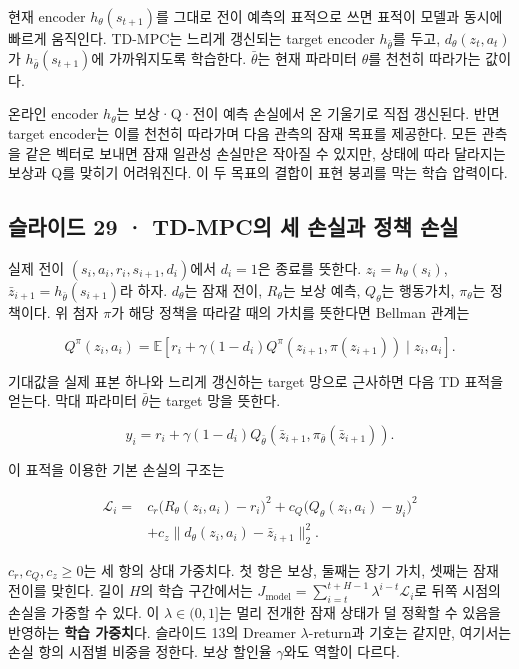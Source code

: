\documentclass[11pt,a4paper]{article}
\begin{document}
현재 encoder $h_\theta(s_{t+1})$를 그대로 전이 예측의 표적으로 쓰면 표적이 모델과 동시에 빠르게 움직인다. TD-MPC는 느리게 갱신되는 target encoder $h_{\bar\theta}$를 두고, $d_\theta(z_t,a_t)$가 $h_{\bar\theta}(s_{t+1})$에 가까워지도록 학습한다. $\bar\theta$는 현재 파라미터 $\theta$를 천천히 따라가는 값이다.\par

온라인 encoder $h_\theta$는 보상·Q·전이 예측 손실에서 온 기울기로 직접 갱신된다. 반면 target encoder는 이를 천천히 따라가며 다음 관측의 잠재 목표를 제공한다. 모든 관측을 같은 벡터로 보내면 잠재 일관성 손실만은 작아질 수 있지만, 상태에 따라 달라지는 보상과 Q를 맞히기 어려워진다. 이 두 목표의 결합이 표현 붕괴를 막는 학습 압력이다.\par

\subsection{슬라이드 29 · TD-MPC의 세 손실과 정책 손실}

실제 전이 $(s_i,a_i,r_i,s_{i+1},d_i)$에서 $d_i=1$은 종료를 뜻한다. $z_i=h_\theta(s_i)$, $\bar z_{i+1}=h_{\bar\theta}(s_{i+1})$라 하자. $d_\theta$는 잠재 전이, $R_\theta$는 보상 예측, $Q_\theta$는 행동가치, $\pi_\theta$는 정책이다. 위 첨자 $\pi$가 해당 정책을 따라갈 때의 가치를 뜻한다면 Bellman 관계는\par

\[
Q^\pi(z_i,a_i)=\mathbb E\!\left[r_i+\gamma(1-d_i)Q^\pi(z_{i+1},\pi(z_{i+1}))\mid z_i,a_i\right].
\]

기대값을 실제 표본 하나와 느리게 갱신하는 target 망으로 근사하면 다음 TD 표적을 얻는다. 막대 파라미터 $\bar\theta$는 target 망을 뜻한다.\par

\[
y_i=r_i+\gamma(1-d_i)Q_{\bar\theta}\!\left(\bar z_{i+1},\pi_{\bar\theta}(\bar z_{i+1})\right).
\]

이 표적을 이용한 기본 손실의 구조는\par

\[
\begin{aligned}
\mathcal L_i={}&c_r\bigl(R_\theta(z_i,a_i)-r_i\bigr)^2
+c_Q\bigl(Q_\theta(z_i,a_i)-y_i\bigr)^2\\
&+c_z\bigl\|d_\theta(z_i,a_i)-\bar z_{i+1}\bigr\|_2^2.
\end{aligned}
\]

$c_r,c_Q,c_z\ge0$는 세 항의 상대 가중치다. 첫 항은 보상, 둘째는 장기 가치, 셋째는 잠재 전이를 맞힌다. 길이 $H$의 학습 구간에서는 $J_{\mathrm{model}}=\sum_{i=t}^{t+H-1}\lambda^{i-t}\mathcal L_i$로 뒤쪽 시점의 손실을 가중할 수 있다. 이 $\lambda\in(0,1]$는 멀리 전개한 잠재 상태가 덜 정확할 수 있음을 반영하는 \textbf{학습 가중치}다. 슬라이드 13의 Dreamer $\lambda$-return과 기호는 같지만, 여기서는 손실 항의 시점별 비중을 정한다. 보상 할인율 $\gamma$와도 역할이 다르다.\par
\end{document}
